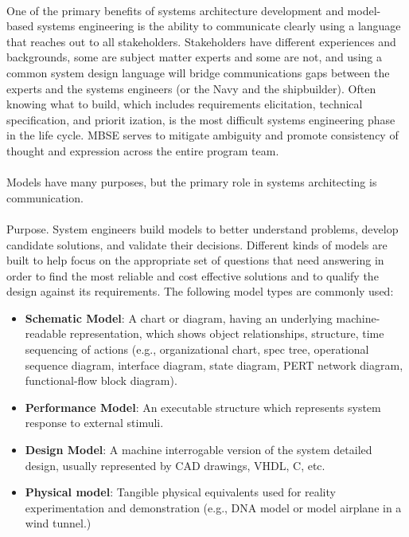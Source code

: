 \documentclass[a4paper,12pt,twoside]{report}
\begin{document}
{			\paragraph{} {One of the primary benefits of systems architecture development and model-based systems engineering is the ability to communicate clearly using a language that reaches out to all stakeholders. Stakeholders have different experiences and backgrounds, some are subject matter experts and some are not, and using a common system design language will bridge communications gaps between the experts and the systems engineers (or the Navy and the shipbuilder). Often knowing what to build, which includes requirements elicitation, technical specification, and priorit ization, is the most difficult systems engineering phase in the life cycle. MBSE serves to mitigate ambiguity and promote consistency of thought and expression across the entire program team. \cite{MBSESystemArchitectureNavalShipDesign}
			}
									
			\paragraph{} {Models have many purposes, but the primary role in systems architecting is communication. \cite{MBSESystemArchitectureNavalShipDesign}
			}
			
			\paragraph{} {Purpose. System engineers build models to better understand problems, develop candidate solutions, and validate their decisions. Different kinds of models are built to help focus on the appropriate set of questions that need answering in order to find the most reliable and cost effective solutions and to qualify the design against its requirements. The following model types are commonly used:
				\begin{itemize}
					\item \textbf{Schematic Model}: A chart or diagram, having an underlying machine-readable representation, which shows object relationships, structure, time sequencing of actions (e.g., organizational chart, spec tree, operational sequence diagram, interface diagram, state diagram, PERT network diagram, functional-flow block diagram).
					\item \textbf{Performance Model}: An executable structure which represents system response to external stimuli.
					\item \textbf{Design Model}: A machine interrogable version of the system detailed design, usually represented by CAD drawings, VHDL, C, etc.
					\item  \textbf{Physical model}: Tangible physical equivalents used for reality experimentation and demonstration (e.g., DNA model or model airplane in a wind tunnel.)
				\end{itemize}
			}
}
\end{document}
